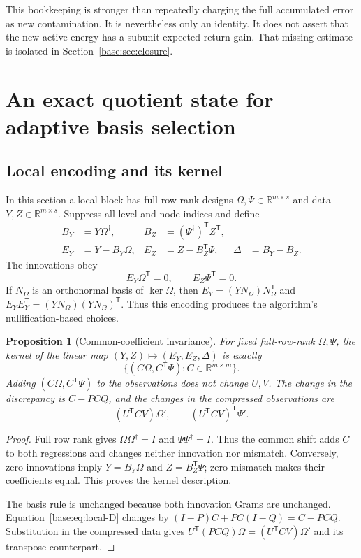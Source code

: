 \documentclass[11pt,oneside,openany,a4paper]{book}
\numberwithin{equation}{chapter}
\newtheorem{proposition}[theorem]{Proposition}
\theoremstyle{definition}
\theoremstyle{remark}
\newcommand{\R}{\mathbb R}\newcommand{\E}{\mathbb E}\newcommand{\Prb}{\mathbb P}\newcommand{\PP}{\mathbb P}
\newcommand{\T}{\mathsf T}\newcommand{\Id}{I}
\begin{document}
This bookkeeping is stronger than repeatedly charging the full accumulated
error as new contamination. It is nevertheless only an identity. It does
not assert that the new active energy has a subunit expected return gain.
That missing estimate is isolated in Section~\ref{base:sec:closure}.

\section{An exact quotient state for adaptive basis selection}\label{base:sec:quotient}
\subsection{Local encoding and its kernel}
In this section a local block has full-row-rank designs
$\Omega,\Psi\in\R^{m\times s}$ and data $Y,Z\in\R^{m\times s}$.
Suppress all level and node indices and define
\begin{align}
 B_Y&=Y\Omega^\dagger,&
 B_Z&=(\Psi^\dagger)^{\T} Z^{\T},\label{base:eq:BY-BZ}\\
 E_Y&=Y-B_Y\Omega,&
 E_Z&=Z-B_Z^{\T}\Psi,&
 \Delta&=B_Y-B_Z.\label{base:eq:encoding}
\end{align}
The innovations obey
\begin{equation}\label{base:eq:innovation-orth}
 E_Y\Omega^{\T}=0,\qquad E_Z\Psi^{\T}=0.
\end{equation}
If $N_\Omega$ is an orthonormal basis of $\ker\Omega$, then
$E_Y=(YN_\Omega)N_\Omega^{\T}$ and
$E_YE_Y^{\T}=(YN_\Omega)(YN_\Omega)^{\T}$.
Thus this encoding produces the algorithm's nullification-based choices.

\begin{proposition}[Common-coefficient invariance]\label{base:prop:quotient}
For fixed full-row-rank $\Omega,\Psi$, the kernel of the linear map
$(Y,Z)\mapsto(E_Y,E_Z,\Delta)$ is exactly
\begin{equation}\label{base:eq:quotient-kernel}
 \{(C\Omega,C^{\T}\Psi):C\in\R^{m\times m}\}.
\end{equation}
Adding $(C\Omega,C^{\T}\Psi)$ to the observations does not change $U,V$.
The change in the discrepancy is $C-PCQ$, and the changes in the compressed
observations are
\begin{equation}\label{base:eq:common-transport}
 (U^{\T}CV)\Omega',\qquad (U^{\T}CV)^{\T}\Psi'.
\end{equation}
\end{proposition}
\begin{proof}
Full row rank gives $\Omega\Omega^\dagger=I$ and
$\Psi\Psi^\dagger=I$. Thus the common shift adds $C$ to both regressions
and changes neither innovation nor mismatch. Conversely, zero innovations
imply $Y=B_Y\Omega$ and $Z=B_Z^{\T}\Psi$; zero mismatch makes their coefficients
equal. This proves the kernel description.

The basis rule is unchanged because both innovation Grams are unchanged.
Equation~\eqref{base:eq:local-D} changes by
$(I-P)C+PC(I-Q)=C-PCQ$. Substitution in the compressed data gives
$U^{\T}(PCQ)\Omega=(U^{\T}CV)\Omega'$ and its transpose counterpart.
\end{proof}
\end{document}
